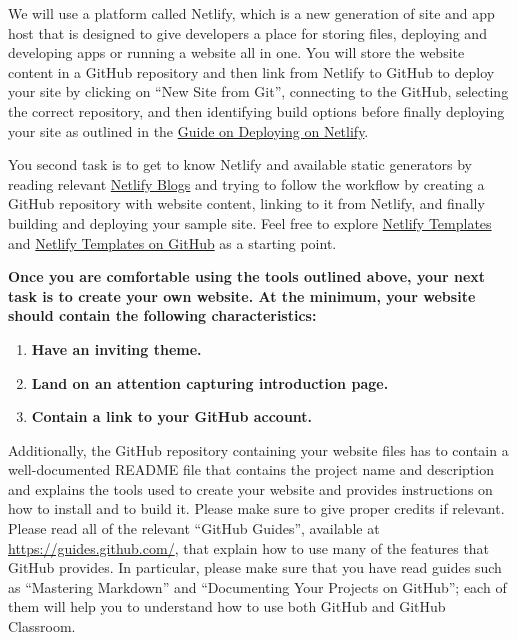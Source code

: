 \documentclass[11pt]{article}
\begin{document}
We will use a platform called Netlify, which  is  a new generation of site and app host that is designed to give developers a place for storing files, deploying and developing apps or running a website all in one. You will store the website content in a GitHub repository and then link from Netlify to GitHub to deploy your site by clicking on ``New Site from Git'', connecting to the GitHub, selecting the correct repository, and then identifying build options before finally deploying your site as outlined in the \href{https://www.netlify.com/blog/2016/09/29/a-step-by-step-guide-deploying-on-netlify/}{Guide on Deploying on Netlify}. 

You second task is to get to know Netlify and available static generators by reading relevant \href{https://www.netlify.com/blog/}{Netlify Blogs} and trying to follow the workflow by creating a  GitHub repository with website content, linking  to it from Netlify, and finally building and deploying your sample site. Feel free to explore \href{https://templates.netlify.com/}{Netlify Templates} and \href{https://github.com/netlify-templates}{Netlify Templates on GitHub} as a starting point. 

\textbf{Once you are comfortable using the tools outlined above, your next task is to create your own website. At the minimum, your website should contain the following characteristics: }
\begin{enumerate}
	\item \textbf{Have an inviting theme. }
	\item \textbf{Land on an attention capturing introduction page.}
	\item \textbf{Contain a link to your GitHub account.}
\end{enumerate}

Additionally, the GitHub repository containing your website files has to contain a well-documented README file that contains the project name and description and explains the tools used to create your website and provides instructions on how to install and to build it. Please make sure to give proper credits if relevant. Please read all of the relevant ``GitHub Guides'', available at
\url{https://guides.github.com/}, that explain how to use many of the features that GitHub provides. In particular,
please make sure that you have read guides such as ``Mastering Markdown'' and ``Documenting Your Projects on GitHub'';
each of them will help you to understand how to use both GitHub and GitHub Classroom. 
\end{document}
